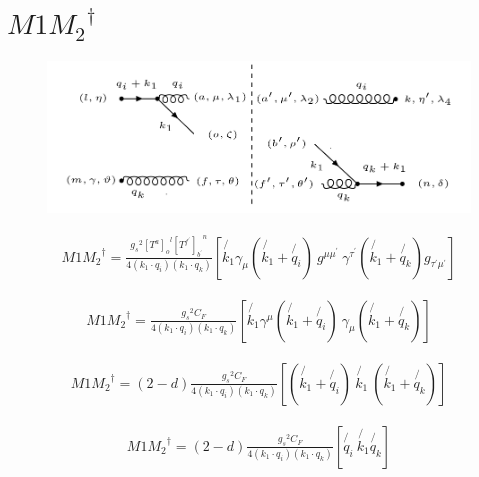 \pagebreak

\section{$ M1{M_2}^{\dagger} $}
\begin{figure}[ht!]
\centering
\includegraphics[scale=0.7]{images/GQ/M1M2Dagger.png}
\end{figure}

\begin{equation}
\begin{split}
M1{M_2}^{\dagger}=\frac{{g_s}^2 {[T^{a}]_o}^{l} {[T^{f^{\prime}}]_{b^{\prime}}}^{n}}{4(k_1 \cdot q_i)(k_1 \cdot q_k)}[\not{k_1}{\gamma}_{\mu}(\not{k_1}+\not{q_i})\:g^{\mu \mu^{\prime}}\: {\gamma}^{{{\tau}^{\prime}}}(\not{k_1}+\not{q_k}) g_{\tau^{\prime} \mu^{\prime}}]
\end{split}
\end{equation}

\begin{equation}
\begin{split}
M1{M_2}^{\dagger}=\frac{{g_s}^2 C_F}{4(k_1 \cdot q_i)(k_1 \cdot q_k)}[\not{k_1}{\gamma}^{\mu}(\not{k_1}+\not{q_i})\: {\gamma}_{{{\mu}}}(\not{k_1}+\not{q_k})]
\end{split}
\end{equation}

\begin{equation}
\begin{split}
M1{M_2}^{\dagger}=(2-d)\frac{{g_s}^2 C_F}{4(k_1 \cdot q_i)(k_1 \cdot q_k)}[(\not{k_1}+\not{q_i})\: \not{k_1}\:(\not{k_1}+\not{q_k})]
\end{split}
\end{equation}

\begin{equation}
\begin{split}
M1{M_2}^{\dagger}=(2-d)\frac{{g_s}^2 C_F}{4(k_1 \cdot q_i)(k_1 \cdot q_k)}[\not{q_i}\: \not{k_1}\not{q_k}]
\end{split}
\end{equation}


